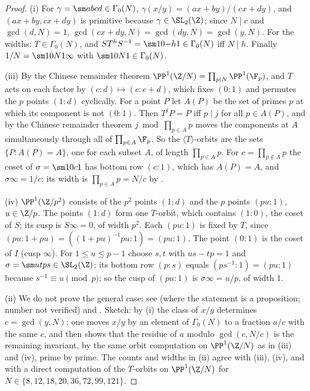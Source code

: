 \begin{proof}
(i) For $\gamma=\sm abcd\in\Gamma_0(N)$, $\gamma(x/y)=(ax+by)/(cx+dy)$, and $(ax+by,cx+dy)$ is primitive because $\gamma\in\SL_2(\Z)$; since $N\mid c$ and $\gcd(d,N)=1$,
$\gcd(cx+dy,N)=\gcd(dy,N)=\gcd(y,N)$. For the widths: $T\in\Gamma_0(N)$, and $ST^hS^{-1}=\sm10{-h}1\in\Gamma_0(N)$ iff $N\mid h$. Finally $1/N=\sm10N1\infty$ with $\sm10N1\in\Gamma_0(N)$.

(iii) By the Chinese remainder theorem $\PP^1(\Z/N)=\prod_{p\mid N}\PP^1(\F_p)$, and $T$ acts on each factor by $(c:d)\mapsto(c:c+d)$, which fixes $(0:1)$ and permutes the $p$
points $(1:d)$ cyclically. For a point $P$ let $A(P)$ be the set of primes $p$ at which its component is not $(0:1)$. Then $T^jP=P$ iff $p\mid j$ for all $p\in A(P)$, and
by the Chinese remainder theorem $j\bmod\prod_{p\in A}p$ moves the components at $A$ simultaneously through all of $\prod_{p\in A}\F_p$. So the $\langle T\rangle$-orbits are the sets
$\{P:A(P)=A\}$, one for each subset $A$, of length $\prod_{p\in A}p$. For $c=\prod_{p\notin A}p$ the coset of $\sigma=\sm10c1$ has bottom row $(c:1)$, which has $A(P)=A$, and
$\sigma\infty=1/c$; its width is $\prod_{p\in A}p=N/c$ by .

(iv) $\PP^1(\Z/p^2)$ consists of the $p^2$ points $(1:d)$ and the $p$ points $(pu:1)$, $u\in\Z/p$. The points $(1:d)$ form one $T$-orbit, which contains $(1:0)$, the coset
of $S$; its cusp is $S\infty=0$, of width $p^2$. Each $(pu:1)$ is fixed by $T$, since $(pu:1+pu)=((1+pu)^{-1}pu:1)=(pu:1)$. The point $(0:1)$ is the coset of $I$
(cusp $\infty$). For $1\le u\le p-1$ choose $s,t$ with $us-tp=1$ and $\sigma=\sm utps\in\SL_2(\Z)$; its bottom row $(p:s)$ equals $(ps^{-1}:1)=(pu:1)$ because $s^{-1}\equiv u
\pmod p$; so the cusp of $(pu:1)$ is $\sigma\infty=u/p$, of width $1$.

(ii) We do not prove the general case; see \cite[Section 3.8]{DiamondShurman} (where the statement is a proposition; number not verified) and
\cite{Ogg73}. Sketch: by (i) the class of $x/y$ determines $c=\gcd(y,N)$; one moves $x/y$ by an element of $\Gamma_0(N)$ to a fraction $a/c$ with the same
$c$, and then shows that the residue of $a$ modulo $\gcd(c,N/c)$ is the remaining invariant, by the same orbit computation on $\PP^1(\Z/N)$ as in (iii) and (iv),
prime by prime. The counts and widths in (ii) agree with (iii), (iv), and with a direct computation of the $T$-orbits on $\PP^1(\Z/N)$ for $N\in\{8,12,18,20,36,72,99,121\}$.
\end{proof}

